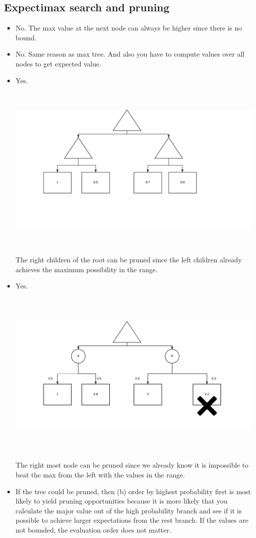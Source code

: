 \documentclass[11pt]{article}
\begin{document}
\begin{onehalfspace}
\section{Expectimax search and pruning}
\begin{itemize}
\item
No. The max value at the next node can always be higher since there is no bound.
\item
No. Same reason as max tree. And also you have to compute values over all nodes to get expected value.
\item
Yes.
\includegraphics[width=16cm, height=9cm]{4_c.png}\\
The right children of the root can be pruned since the left children already achieves the maximum possibility in the range.
\item
Yes.
\includegraphics[width=16cm, height=9cm]{4_d.png}\\
The right most node can be pruned since we already know it is impossible to beat the max from the left with the values in the range.
\item
If the tree could be pruned, then (b) order by highest probability first is most likely to yield pruning opportunities because it is more likely that you calculate the major value out of the high probability branch and see if it is possible to achieve larger expectations from the rest branch. If the values are not bounded,  the evaluation order does not matter.
\end{itemize}
\end{onehalfspace}
\end{document}
